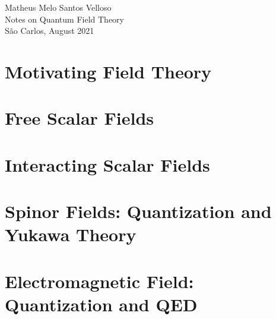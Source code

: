 \documentclass[a4paper,12pt]{report}
\begin{document}
\begin{titlepage}
    \begin{center}  
    \vspace{8cm}
    \large{Matheus Melo Santos Velloso}\\
    \vfill
    \Large{Notes on Quantum Field Theory}\\
    \vfill
    \large{São Carlos, August 2021} 
    \end{center}
\end{titlepage}

\newpage

\tableofcontents
\newpage
{}



\part{Motivating Field Theory}


\part{Free Scalar Fields}


\part{Interacting Scalar Fields}





\part{Spinor Fields: Quantization and Yukawa Theory}





%
\part{Electromagnetic Field: Quantization and QED}




\nocite{*}
\end{document}
